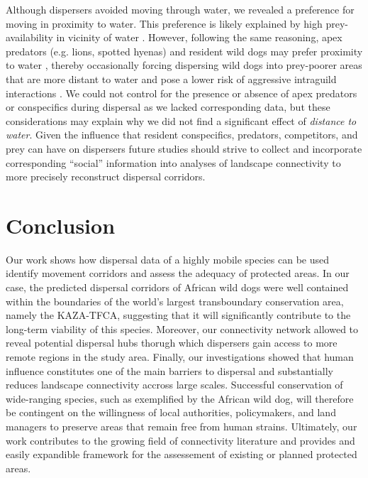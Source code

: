 \documentclass[abstract=on,10pt,a4paper,bibliography=totocnumbered]{article}
\begin{document}
Although dispersers avoided moving through water, we revealed a preference for
moving in proximity to water. This preference is likely explained by high
prey-availability in vicinity of water \citep{Western.1975, Bonyongo.2005}.
However, following the same reasoning, apex predators (e.g. lions, spotted
hyenas) and resident wild dogs may prefer proximity to water
\citep{Valeix.2010}, thereby occasionally forcing dispersing wild dogs into
prey-poorer areas that are more distant to water \citep{Ndaimani.2016} and pose
a lower risk of aggressive intraguild interactions \citep{Creel.1996,
Mills.1997, Webster.2012}. We could not control for the presence or absence of
apex predators or conspecifics during dispersal as we lacked corresponding data,
but these considerations may explain why we did not find a significant effect of
\textit{distance to water}. Given the influence that resident conspecifics,
predators, competitors, and prey can have on dispersers \citep{Cozzi.2018,
Armansin.2019} future studies should strive to collect and incorporate
corresponding ``social'' information into analyses of landscape connectivity to
more precisely reconstruct dispersal corridors.

\section{Conclusion}
Our work shows how dispersal data of a highly mobile species can be used
identify movement corridors and assess the adequacy of protected areas. In our
case, the predicted dispersal corridors of African wild dogs were well contained
within the boundaries of the world's largest transboundary conservation area,
namely the KAZA-TFCA, suggesting that it will significantly contribute to the
long-term viability of this species. Moreover, our connectivity network allowed
to reveal potential dispersal hubs thorugh which dispersers gain access to more
remote regions in the study area. Finally, our investigations showed that human
influence constitutes one of the main barriers to dispersal and substantially
reduces landscape connectivity accross large scales. Successful conservation of
wide-ranging species, such as exemplified by the African wild dog, will
therefore be contingent on the willingness of local authorities, policymakers,
and land managers to preserve areas that remain free from human strains.
Ultimately, our work contributes to the growing field of connectivity literature
and provides and easily expandible framework for the assessement of existing or
planned protected areas.
\end{document}

